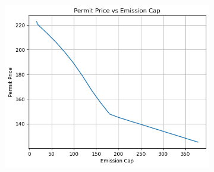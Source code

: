 \documentclass[a4paper,twoside,10pt]{article}
\begin{document}
\begin{figure}
	
	\vspace{1cm} %
	\begin{subfigure}[b]{0.6\linewidth}
	\centering
	\includegraphics[width=\linewidth]{images/Permit_price_vs_Emission_cap/20-350}
	\caption{}
	\label{fig:20-350}
\end{subfigure}
\end{figure}
	
\end{document}
